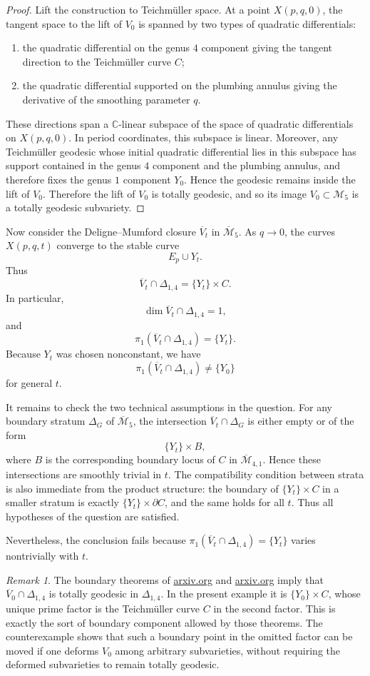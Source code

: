 \documentclass[11pt]{article}
\theoremstyle{remark}
\newtheorem{remark}[theorem]{Remark}
\newcommand{\Mbar}{\overline{\mathcal M}}
\newcommand{\M}{\mathcal M}
\newcommand{\C}{\mathbb C}
\newcommand{\p}{\partial}
\begin{document}
\begin{proof}
Lift the construction to Teichm\"uller space. At a point \(X(p,q,0)\), the tangent space to the lift of \(V_0\) is spanned by two types of quadratic differentials:
\begin{enumerate}
\item the quadratic differential on the genus \(4\) component giving the tangent direction to the Teichm\"uller curve \(C\);
\item the quadratic differential supported on the plumbing annulus giving the derivative of the smoothing parameter \(q\).
\end{enumerate}
These directions span a \(\C\)-linear subspace of the space of quadratic differentials on \(X(p,q,0)\). In period coordinates, this subspace is linear. Moreover, any Teichm\"uller geodesic whose initial quadratic differential lies in this subspace has support contained in the genus \(4\) component and the plumbing annulus, and therefore fixes the genus \(1\) component \(Y_0\). Hence the geodesic remains inside the lift of \(V_0\). Therefore the lift of \(V_0\) is totally geodesic, and so its image \(V_0\subset \M_5\) is a totally geodesic subvariety.
\end{proof}

Now consider the Deligne--Mumford closure \(\overline V_t\) in \(\Mbar_5\). As \(q\to 0\), the curves \(X(p,q,t)\) converge to the stable curve
\[
E_p\cup Y_t.
\]
Thus
\[
\overline V_t\cap \Delta_{1,4}=\{Y_t\}\times C.
\]
In particular,
\[
\dim \overline V_t\cap \Delta_{1,4}=1,
\]
and
\[
\pi_1(\overline V_t\cap \Delta_{1,4})=\{Y_t\}.
\]
Because \(Y_t\) was chosen nonconstant, we have
\[
\pi_1(\overline V_t\cap \Delta_{1,4})\neq \{Y_0\}
\]
for general \(t\).

It remains to check the two technical assumptions in the question. For any boundary stratum \(\Delta_G\) of \(\overline{\M}_5\), the intersection \(\overline V_t\cap \Delta_G\) is either empty or of the form
\[
\{Y_t\}\times B,
\]
where \(B\) is the corresponding boundary locus of \(C\) in \(\Mbar_{4,1}\). Hence these intersections are smoothly trivial in \(t\). The compatibility condition between strata is also immediate from the product structure: the boundary of \(\{Y_t\}\times C\) in a smaller stratum is exactly \(\{Y_t\}\times \p C\), and the same holds for all \(t\). Thus all hypotheses of the question are satisfied.

Nevertheless, the conclusion fails because \(\pi_1(\overline V_t\cap \Delta_{1,4})=\{Y_t\}\) varies nontrivially with \(t\).

\begin{remark}
The boundary theorems of \href{https://arxiv.org/html/2412.06765v1}{arxiv.org} and \href{https://arxiv.org/html/2412.16330v2}{arxiv.org} imply that \(\overline V_0\cap \Delta_{1,4}\) is totally geodesic in \(\Delta_{1,4}\). In the present example it is \(\{Y_0\}\times C\), whose unique prime factor is the Teichm\"uller curve \(C\) in the second factor. This is exactly the sort of boundary component allowed by those theorems. The counterexample shows that such a boundary point in the omitted factor can be moved if one deforms \(V_0\) among arbitrary subvarieties, without requiring the deformed subvarieties to remain totally geodesic.
\end{remark}
\end{document}
